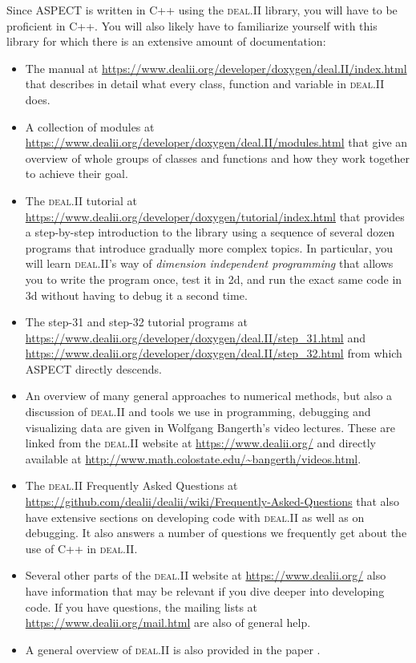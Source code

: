 \documentclass{article}
\newcommand{\dealii}{{\textsc{deal.II}}}
\newcommand{\aspect}{\textsc{ASPECT}}
\begin{document}
Since \aspect{} is written in C++ using the \dealii{} library, you
will have to be proficient in C++. You will also likely have
to familiarize yourself with this library for which there is an extensive
amount of documentation:
\begin{itemize}
\item The manual at
  \url{https://www.dealii.org/developer/doxygen/deal.II/index.html} that
  describes in detail what every class, function and variable in \dealii{}
  does.
\item A collection of modules at
  \url{https://www.dealii.org/developer/doxygen/deal.II/modules.html} that give
  an overview of whole groups of classes and functions and how they work
  together to achieve their goal.
\item The \dealii{} tutorial at
  \url{https://www.dealii.org/developer/doxygen/tutorial/index.html} that
  provides a step-by-step introduction to the library using a sequence of
  several dozen programs that introduce gradually more complex topics. In
  particular, you will learn \dealii's way of \textit{dimension independent
  programming} that allows you to write the program once, test it in 2d, and
  run the exact same code in 3d without having to debug it a second time.
\item The step-31 and step-32 tutorial programs at
  \url{https://www.dealii.org/developer/doxygen/deal.II/step_31.html} and
  \url{https://www.dealii.org/developer/doxygen/deal.II/step_32.html} from
  which \aspect{} directly descends.
\item An overview of many general approaches to numerical methods, but also
  a discussion of \dealii{} and tools we use in programming, debugging and
  visualizing data are given in Wolfgang Bangerth's video lectures. These
  are linked from the \dealii{} website at \url{https://www.dealii.org/}
  and directly available at
  \url{http://www.math.colostate.edu/~bangerth/videos.html}.
\item The \dealii{} Frequently Asked Questions at
  \url{https://github.com/dealii/dealii/wiki/Frequently-Asked-Questions}
  that also have extensive sections on developing code with \dealii{} as well
  as on debugging. It also answers a number of questions we frequently get
  about the use of C++ in \dealii{}.
\item Several other parts of the \dealii{} website at
  \url{https://www.dealii.org/} also have information that may be relevant if
  you dive deeper into developing code. If you have questions, the mailing
  lists at \url{https://www.dealii.org/mail.html} are also of general help.
\item A general overview of \dealii{} is also provided in the paper
  \cite{BHK07}.
\end{itemize}
\end{document}
